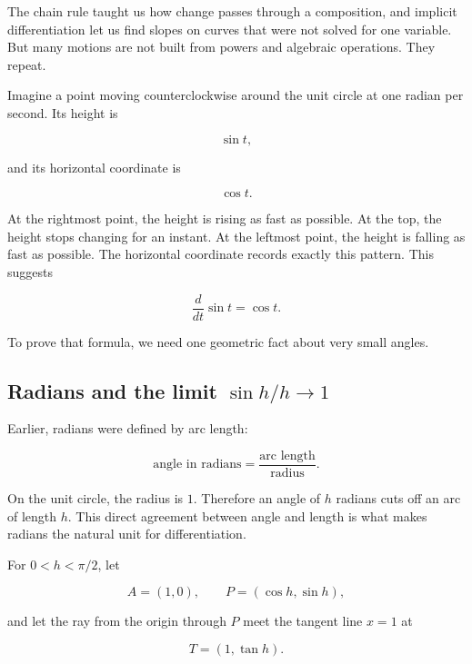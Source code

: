 The chain rule taught us how change passes through a composition, and implicit
differentiation let us find slopes on curves that were not solved for one variable.
But many motions are not built from powers and algebraic operations. They repeat.

Imagine a point moving counterclockwise around the unit circle at one radian per
second. Its height is

\[
\sin t,
\]

and its horizontal coordinate is

\[
\cos t.
\]

At the rightmost point, the height is rising as fast as possible. At the top, the
height stops changing for an instant. At the leftmost point, the height is falling as
fast as possible. The horizontal coordinate records exactly this pattern. This suggests

\[
\frac{d}{dt}\sin t=\cos t.
\]

To prove that formula, we need one geometric fact about very small angles.

\subsection{Radians and the limit \texorpdfstring{$\sin h/h\to 1$}{sin h / h -> 1}}
\label{subsec:radians-sinhh}

Earlier, radians were defined by arc length:

\[
\text{angle in radians}
=
\frac{\text{arc length}}{\text{radius}}.
\]

On the unit circle, the radius is \(1\). Therefore an angle of \(h\) radians cuts off
an arc of length \(h\). This direct agreement between angle and length is what makes
radians the natural unit for differentiation.

For \(0<h<\pi/2\), let

\[
A=(1,0),
\qquad
P=(\cos h,\sin h),
\]

and let the ray from the origin through \(P\) meet the tangent line \(x=1\) at

\[
T=(1,\tan h).
\]

